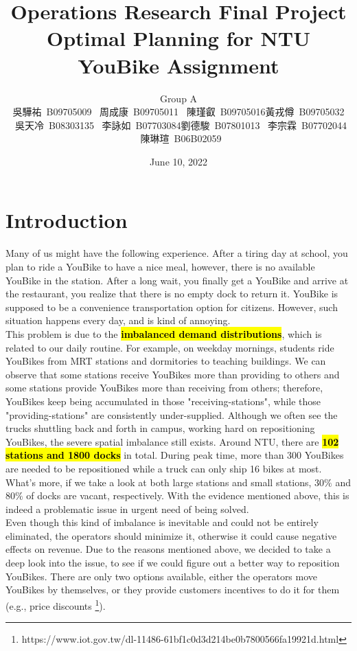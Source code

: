 \documentclass[a4paper, 12pt]{article}%
\title{Operations Research Final Project\\
Optimal Planning for NTU YouBike Assignment}
\author{
Group A\\
吳驊祐\, B09705009 \ 周成康\, B09705011 \ 陳瑾叡\, B09705016\qquad\qquad 黃戎僔\, B09705032 \ 吳天冷\, B08303135 \ 李詠如\, B07703084\qquad\qquad 劉德駿\, B07801013 \ 李宗霖\, B07702044 \ 陳琳瑄\, B06B02059\qquad\qquad}
\date{June 10, 2022}
\theoremstyle{definition}
\begin{document}
\maketitle
\justifying


\section{Introduction}


Many of us might have the following experience. After a tiring day at school, you plan to ride a YouBike to have a nice meal, however, there is no available YouBike in the station. After a long wait, you finally get a YouBike and arrive at the restaurant, you realize that there is no empty dock to return it. YouBike is supposed to be a convenience transportation option for citizens. However, such situation happens every day, and is kind of annoying.\\

\noindent This problem is due to the \hl{\textbf{imbalanced demand distributions}}, which is related to our daily routine. For example, on weekday mornings, students ride YouBikes from MRT stations and dormitories to teaching buildings. We can observe that some stations receive YouBikes more than providing to others and some stations provide YouBikes more than receiving from others; therefore, YouBikes keep being accumulated in those "receiving-stations", while those "providing-stations" are consistently under-supplied. Although we often see the trucks shuttling back and forth in campus, working hard on repositioning YouBikes, the severe spatial imbalance still exists. Around NTU, there are \hl{\textbf{102 stations and 1800 docks}} in total. During peak time, more than 300 YouBikes are needed to be repositioned while a truck can only ship 16 bikes at most. What's more, if we take a look at both large stations and small stations, $30\%$ and $80\%$ of docks are vacant, respectively. With the evidence mentioned above, this is indeed a problematic issue in urgent need of being solved.\\

\noindent Even though this kind of imbalance is inevitable and could not be entirely eliminated, the operators should minimize it, otherwise it could cause negative effects on revenue. Due to the reasons mentioned above, we decided to take a deep look into the issue, to see if we could figure out a better way to reposition YouBikes. There are only two options available, either the operators move YouBikes by themselves, or they provide customers incentives to do it for them (e.g., price discounts \footnote{https://www.iot.gov.tw/dl-11486-61bf1c0d3d214be0b7800566fa19921d.html}).\\
\end{document}
